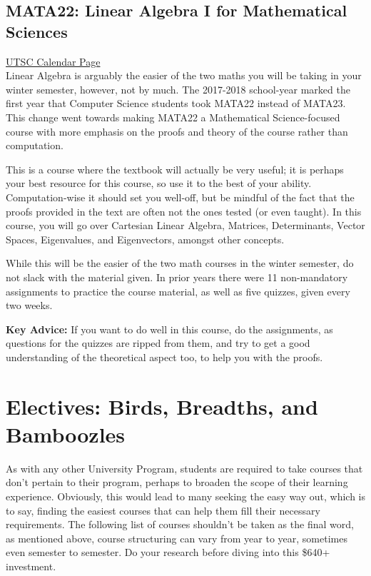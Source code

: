 \documentclass[11pt]{article}
\begin{document}
\subsection{MATA22: Linear Algebra I for Mathematical Sciences}

\href{https://utsc.calendar.utoronto.ca/course/MATA22H3}{UTSC Calendar Page}\\

Linear Algebra is arguably the easier of the two maths you will be taking in your winter semester, however, not by much. The 2017-2018 school-year marked the first year that Computer Science students took MATA22 instead of MATA23.  This change went towards making MATA22 a Mathematical Science-focused course with more emphasis on the proofs and theory of the course rather than computation.\par
This is a course where the textbook will actually be very useful; it is perhaps your best resource for this course, so use it to the best of your ability. Computation-wise it should set you well-off, but be mindful of the fact that the proofs provided in the text are often not the ones tested (or even taught). In this course, you will go over Cartesian Linear Algebra, Matrices, Determinants, Vector Spaces, Eigenvalues, and Eigenvectors, amongst other concepts. \par
While this will be the easier of the two math courses in the winter semester, do not slack with the material given. In prior years there were 11 non-mandatory assignments to practice the course material, as well as five quizzes, given every two weeks. \par
\textbf{Key Advice:} If you want to do well in this course, do the assignments, as questions for the quizzes are ripped from them, and try to get a good understanding of the theoretical aspect too, to help you with the proofs.

\section{Electives: Birds, Breadths, and Bamboozles}
As with any other University Program, students are required to take courses that don't pertain to their program, perhaps to broaden the scope of their learning experience.  Obviously, this would lead to many seeking the easy way out, which is to say, finding the easiest courses that can help them fill their necessary requirements.  The following list of courses shouldn't be taken as the final word, as mentioned above, course structuring can vary from year to year, sometimes even semester to semester.  Do your research before diving into this \$640+ investment.
\end{document}
